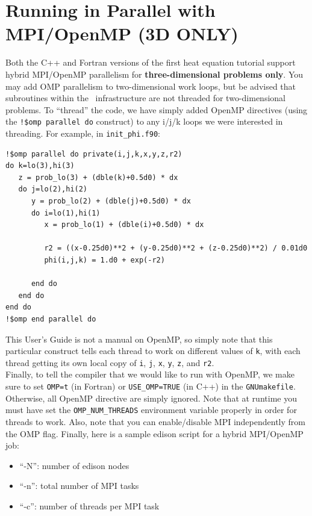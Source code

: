 \section{Running in Parallel with MPI/OpenMP (3D ONLY)}\label{Sec:OpenMP}
Both the C++ and Fortran versions of the first heat equation tutorial 
support hybrid MPI/OpenMP parallelism for {\bf three-dimensional problems only}.
You may add OMP parallelism to two-dimensional work loops, but be advised that subroutines within the \BoxLib\ infrastructure 
are not threaded for two-dimensional problems.
To ``thread'' the code, we have simply added OpenMP directives (using the {\tt !\$omp parallel do} 
construct) to any i/j/k loops we were interested in threading.  For example, in {\tt init\_phi.f90}:
\begin{lstlisting}[backgroundcolor=\color{light-green}]
!$omp parallel do private(i,j,k,x,y,z,r2)
do k=lo(3),hi(3)
   z = prob_lo(3) + (dble(k)+0.5d0) * dx
   do j=lo(2),hi(2)
      y = prob_lo(2) + (dble(j)+0.5d0) * dx
      do i=lo(1),hi(1)
         x = prob_lo(1) + (dble(i)+0.5d0) * dx

         r2 = ((x-0.25d0)**2 + (y-0.25d0)**2 + (z-0.25d0)**2) / 0.01d0
         phi(i,j,k) = 1.d0 + exp(-r2)
 
      end do
   end do
end do
!$omp end parallel do
\end{lstlisting}
This User's Guide is not a manual on OpenMP, so simply note that this particular 
construct tells each thread to work on different values of {\tt k}, with each 
thread getting its own local copy of {\tt i}, {\tt j}, {\tt x}, {\tt y}, {\tt z}, and {\tt r2}.\\

Finally, to tell the compiler that we would like to run with OpenMP, we make sure to
set {\tt OMP=t} (in Fortran) or {\tt USE\_OMP=TRUE} (in C++) in the {\tt GNUmakefile}.
Otherwise, all OpenMP directive are
simply ignored.  Note that at runtime you must have set the 
{\tt OMP\_NUM\_THREADS} environment variable properly in order for threads to work.
Also, note that you can enable/disable MPI independently from the OMP flag.  Finally,
here is a sample edison script for a hybrid MPI/OpenMP job:

\begin{itemize}
\item ``-N'': number of edison nodes
\item ``-n'': total number of MPI tasks
\item ``-c'': number of threads per MPI task

\end{itemize}
